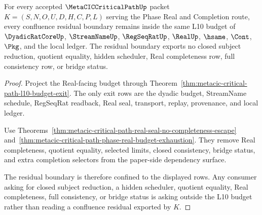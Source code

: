 \begin{theorem}
\label{thm:metacic-critical-path-confluence-residual-boundary}
For every accepted $\MetaCICCriticalPathUp$ packet $K=(S,N,O,U,D,H,C,P,L)$ serving the Phase Real and Completion route, every confluence residual boundary remains inside the same L10 budget of $\DyadicRatCoreUp$, $\StreamNameUp$, $\RegSeqRatUp$, $\RealUp$, $\hsame$, $\Cont$, $\Pkg$, and the local ledger. The residual boundary exports no closed subject reduction, quotient equality, hidden scheduler, Real completeness row, full consistency row, or bridge status.
\end{theorem}
\begin{proof}
Project the Real-facing budget through Theorem~\ref{thm:metacic-critical-path-l10-budget-exit}. The only exit rows are the dyadic budget, StreamName schedule, RegSeqRat readback, Real seal, transport, replay, provenance, and local ledger.

Use Theorems~\ref{thm:metacic-critical-path-real-seal-no-completeness-escape} and~\ref{thm:metacic-critical-path-phase-real-budget-exhaustion}. They remove Real completeness, quotient equality, selected limits, closed consistency, bridge status, and extra completion selectors from the paper-side dependency surface.

The residual boundary is therefore confined to the displayed rows. Any consumer asking for closed subject reduction, a hidden scheduler, quotient equality, Real completeness, full consistency, or bridge status is asking outside the L10 budget rather than reading a confluence residual exported by $K$.
\end{proof}
